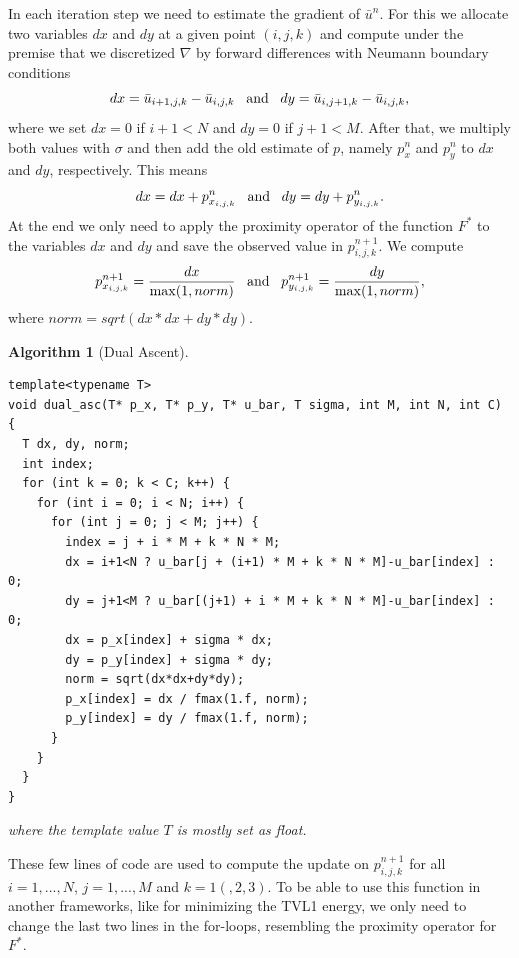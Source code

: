 \documentclass{scrreprt}
\newtheorem{algorithm}[theorem]{Algorithm}
\begin{document}
                In each iteration step we need to estimate the gradient of $\bar{u}^{n}$. For this we allocate two variables $dx$ and $dy$ at a given point $(i,j,k)$ and compute under the premise that we discretized $\nabla$ by forward differences with Neumann boundary conditions
                    $$
                        dx = \bar{u}_{i+1,j,k} - \bar{u}_{i,j,k} \,\,\,\,\, \textnormal{and} \,\,\,\,\, dy = \bar{u}_{i,j+1,k} - \bar{u}_{i,j,k},
                    $$
                where we set $dx = 0$ if $i + 1 < N$ and $dy = 0$ if $j + 1 < M$.
                After that, we multiply both values with $\sigma$ and then add the old estimate of $p$, namely $p_{x}^{n}$ and $p_{y}^{n}$ to $dx$ and $dy$, respectively. This means
                    $$
                        dx = dx + p_{x_{i,j,k}}^{n} \,\,\,\,\, \textnormal{and} \,\,\,\,\, dy = dy + p_{y_{i,j,k}}^{n}.
                    $$
                At the end we only need to apply the proximity operator of the function $F^{\ast}$ to the variables $dx$ and $dy$ and save the observed value in $p_{i,j,k}^{n+1}$. We compute
                    $$
                        p_{x_{i,j,k}}^{n+1} = \frac{dx}{\max(1, norm)} \,\,\,\,\, \textnormal{and} \,\,\,\,\, p_{y_{i,j,k}}^{n+1} = \frac{dy}{\max(1, norm)},
                    $$
                where $norm = sqrt(dx*dx+dy*dy)$.
                \begin{algorithm}[Dual Ascent]
                \label{alg:dual_ascent}
                    \begin{lstlisting}
template<typename T>
void dual_asc(T* p_x, T* p_y, T* u_bar, T sigma, int M, int N, int C) {
  T dx, dy, norm;
  int index;
  for (int k = 0; k < C; k++) {
    for (int i = 0; i < N; i++) {
      for (int j = 0; j < M; j++) {
        index = j + i * M + k * N * M;
        dx = i+1<N ? u_bar[j + (i+1) * M + k * N * M]-u_bar[index] : 0;
        dy = j+1<M ? u_bar[(j+1) + i * M + k * N * M]-u_bar[index] : 0;
        dx = p_x[index] + sigma * dx;
        dy = p_y[index] + sigma * dy;
        norm = sqrt(dx*dx+dy*dy);
        p_x[index] = dx / fmax(1.f, norm);
        p_y[index] = dy / fmax(1.f, norm);
      }
    }
  }
}
                    \end{lstlisting}
                    where the template value $T$ is mostly set as float.
                \end{algorithm}

            These few lines of code are used to compute the update on $p_{i,j,k}^{n+1}$ for all $i = 1, ..., N$, $j = 1, ..., M$ and $k = 1(, 2, 3)$. To be able to use this function in another frameworks, like for minimizing the TVL1 energy, we only need to change the last two lines in the for-loops, resembling the proximity operator for $F^{\ast}$.
\end{document}
